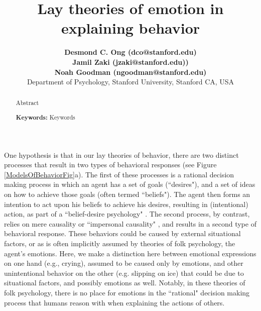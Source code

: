 \documentclass[10pt,letterpaper]{article}
\title{ Lay theories of emotion in explaining behavior }
\author{{\large \bf Desmond C. Ong (dco@stanford.edu)} \\
{\large \bf Jamil Zaki (jzaki@stanford.edu))} \\
{\large \bf Noah Goodman (ngoodman@stanford.edu)} \\
  Department of Psychology, Stanford University, Stanford CA, USA 
}
\begin{document}
\maketitle

\begin{abstract}
Abstract

\textbf{Keywords:} 
Keywords
\end{abstract}














One hypothesis is that in our lay theories of behavior, there are two distinct processes that result in two types of behavioral responses (see Figure \ref{ModelsOfBehaviorFig}a). The first of these processes is a rational decision making process in which an agent has a set of goals (``desires"), and a set of ideas on how to achieve those goals (often termed ``beliefs"). The agent then forms an intention to act upon his beliefs to achieve his desires, resulting in (intentional) action, as part of a ``belief-desire psychology" \cite{Dennett1989, Gopnik1997, Heider1958, Malle2011, Searle2001}. The second process, by contrast, relies on mere causality or ``impersonal causality" \cite{Heider1958}, and results in a second type of behavioral response. These behaviors could be caused by external situational factors, or as is often implicitly assumed by theories of folk psychology, the agent's emotions. Here, we make a distinction here between emotional expressions on one hand (e.g., crying), assumed to be caused only by emotions, and other unintentional behavior on the other (e.g. slipping on ice) that could be due to situational factors, and possibly emotions as well. Notably, in these theories of folk psychology, there is no place for emotions in the ``rational" decision making process that humans reason with when explaining the actions of others.
\end{document}
